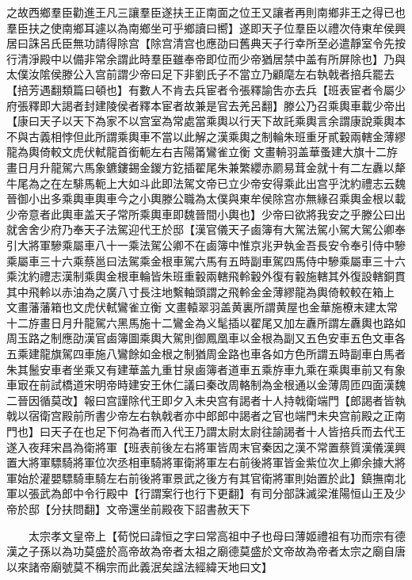 之故西鄉羣臣勸進王凡三讓羣臣遂扶王正南面之位王又讓者再則南鄉非王之得已也羣臣扶之使南鄉耳遽以為南鄉坐可乎鄉讀曰嚮】遂即天子位羣臣以禮次侍東牟侯興居曰誅呂氏臣無功請得除宫【除宫清宫也應劭曰舊典天子行幸所至必遣靜室令先按行清淨殿中以備非常余謂此時羣臣雖奉帝即位而少帝猶居禁中盖有所屏除也】乃與太僕汝隂侯滕公入宫前謂少帝曰足下非劉氏子不當立乃顧麾左右執戟者掊兵罷去【掊芳遇翻類篇曰頓也】有數人不肯去兵宦者令張釋諭吿亦去兵【班表宦者令屬少府張釋即大謁者封建陵侯者釋本宦者故兼是官去羌呂翻】滕公乃召乘輿車載少帝出【康曰天子以天下為家不以宫室為常處當乘輿以行天下故託乘輿言余謂康說乘輿本不與古義相悖但此所謂乘輿車不當以此解之漢乘輿之制輪朱班重牙貳轂兩轄金薄繆龍為輿倚較文虎伏軾龍首銜軛左右吉陽筩鸞雀立衡文畫輈羽盖華蚤建大旗十二斿畫日月升龍駕六馬象鑣鏤錫金鍐方釳插翟尾朱兼繁纓赤罽易茸金就十有二左纛以犛牛尾為之在左騑馬軛上大如斗此即法駕文帝已立少帝安得乘此出宫乎沈約禮志云魏晉御小出多乘輿車輿車今之小輿滕公職為太僕與東牟侯除宫亦無緣召乘輿金根以載少帝意者此輿車盖天子常所乘輿車即魏晉間小輿也】少帝曰欲將我安之乎滕公曰出就舍舍少府乃奉天子法駕迎代王於邸【漢官儀天子鹵簿有大駕法駕小駕大駕公卿奉引大將軍驂乘屬車八十一乘法駕公卿不在鹵簿中惟京兆尹執金吾長安令奉引侍中驂乘屬車三十六乘蔡邕曰法駕乘金根車駕六馬有五時副車駕四馬侍中驂乘屬車三十六乘沈約禮志漢制乘輿金根車輪皆朱班重轂兩轄飛軨轂外復有轂施轄其外復設轄銅貫其中飛軨以赤油為之廣八寸長注地繫軸頭謂之飛軨金金薄繆龍為輿倚較較在箱上文畫藩藩箱也文虎伏軾鸞雀立衡文畫轅翠羽盖黄裏所謂黄屋也金華施橑末建太常十二斿畫日月升龍駕六黑馬施十二鸞金為义髦插以翟尾又加左纛所謂左纛輿也路如周玉路之制應劭漢官鹵簿圖乘輿大駕則御鳳凰車以金根為副又五色安車五色文車各五乘建龍旗駕四車施八鸞餘如金根之制猶周金路也車各如方色所謂五時副車白馬者朱其鬛安車者坐乘又有建華盖九重甘泉鹵簿者道車五乘斿車九乘在乘輿車前又有象車㝡在前試橋道宋明帝時建安王休仁議曰秦改周輅制為金根通以金薄周匝四面漢魏二晉因循莫改】報曰宫謹除代王即夕入未央宫有謁者十人持戟衛端門【郎謁者皆執戟以宿衛宫殿前所書少帝左右執戟者亦中郎郎中謁者之官也端門未央宫前殿之正南門也】曰天子在也足下何為者而入代王乃謂太尉太尉往諭謁者十人皆掊兵而去代王遂入夜拜宋昌為衛將軍【班表前後左右將軍皆周末官秦因之漢不常置蔡質漢儀漢興置大將軍驃騎將軍位次丞相車騎將軍衛將軍左右前後將軍皆金紫位次上卿余據大將軍始於灌嬰驃騎車騎左右前後將軍景武之後方有其官衛將軍則始置於此】鎮撫南北軍以張武為郎中令行殿中【行謂案行也行下更翻】有司分部誅滅梁淮陽恒山王及少帝於邸【分扶問翻】文帝還坐前殿夜下詔書赦天下

　　太宗孝文皇帝上【荀悦曰諱恒之字曰常高祖中子也母曰薄姬禮祖有功而宗有德漢之子孫以為功莫盛於高帝故為帝者太祖之廟德莫盛於文帝故為帝者太宗之廟自唐以來諸帝廟號莫不稱宗而此義泯矣諡法經緯天地曰文】

